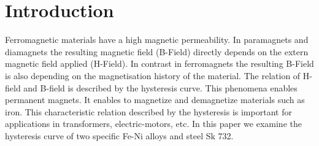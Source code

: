 \documentclass[a4paper,10pt,twocolumn]{article}
\begin{document}
    \section{Introduction}
    Ferromagnetic materials have a high magnetic permeability.
    In paramagnets and diamagnets the resulting magnetic field (B-Field) directly depends on the
    extern magnetic field applied (H-Field).
    In contrast in ferromagnets the resulting B-Field is also depending on the magnetisation history of the material.
    The relation of H-field and B-field is described by the hysteresis curve.
    This phenomena enables permanent magnets.
    It enables to magnetize and demagnetize materials such as iron.
    This characteristic relation described by the hysteresis is important for applications in transformers,
    electric-motors, etc.
    In this paper we examine the hysteresis curve of two specific Fe-Ni alloys and steel Sk 732.
    
\end{document}
